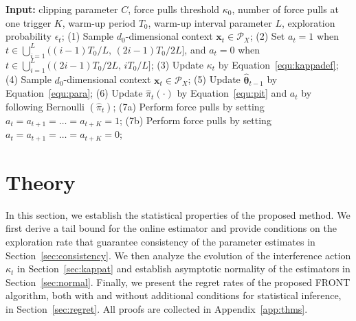 \documentclass[12pt]{article}
\begin{document}
\begin{algorithm}[!t]
\caption{FRONT under $\epsilon$-Greedy}
\label{alg}
\begin{algorithmic}[0]
\State \textbf{Input:} %
clipping parameter $C$, force pulls threshold $\kappa_0$, number of force pulls at one trigger $K$, warm-up period $T_0$, warm-up interval parameter $L$, exploration probability $\epsilon_t$;
    \State (1) Sample $d_0$-dimensional context $\bm{x}_t \in \mathcal{P}_X$;
    \State (2) Set $a_t = 1$ when $t \in \bigcup_{i=1}^L ((i-1)T_0/L,\,(2i-1)T_0/{2L}]$, and $a_t = 0$ when $t \in \bigcup_{i=1}^L ((2i-1)T_0/{2L}, \, iT_0/L]$;
    \State (3) Update $ \kappa_t$ by Equation~\eqref{equ:kappadef};
\EndFor
{} 
\State (4) Sample $d_0$-dimensional context $\bm{x}_t \in \mathcal{P}_X$;
\State (5) Update $\widehat{\bm{\theta}}_{t-1}$ by Equation~\eqref{equ:para};
\State (6) Update $\widehat{\pi}_t(\cdot)$ by Equation~\eqref{equ:pit} and $a_t$ by following Bernoulli $(\widehat{\pi}_t)$;
\State (7a) Perform force pulls by setting $a_{t}=a_{t+1}=\ldots= a_{t+K}=1$;
\Else
\State (7b) Perform force pulls by setting $a_{t}=a_{t+1}=\ldots =a_{t+K}=0$;
\EndIf
\EndIf
\EndFor
\end{algorithmic}
\end{algorithm}


\section{Theory}
\label{sec:theory}

In this section, we establish the statistical properties of the proposed method. We first derive a tail bound for the online estimator and provide conditions on the exploration rate that guarantee consistency of the parameter estimates in Section~\ref{sec:consistency}. We then analyze the evolution of the interference action $\kappa_t$ in Section~\ref{sec:kappat} and establish asymptotic normality of the estimators in Section~\ref{sec:normal}. Finally, we present the regret rates of the proposed FRONT algorithm, both with and without additional conditions for statistical inference, in Section~\ref{sec:regret}. All proofs are collected in Appendix~\ref{app:thms}.
\end{document}
